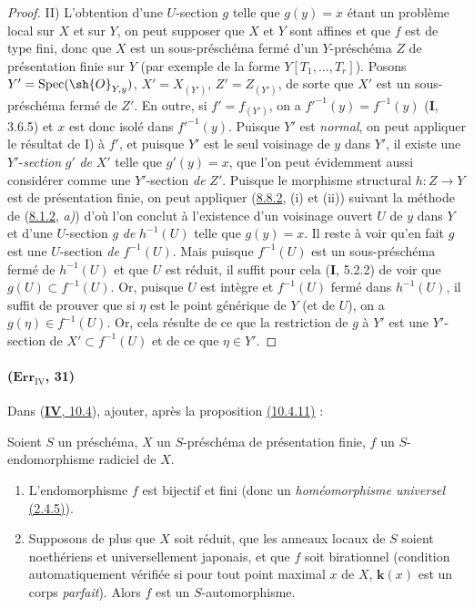 \begin{proof}
\textup{II)} L'obtention d'une $U$-section $g$ telle que $g(y)=x$ étant
un problème local sur $X$ et sur $Y$, on peut supposer que $X$ et $Y$
sont affines et que $f$ est de type fini, donc que $X$ est un
sous-préschéma fermé d'un $Y$-préschéma $Z$ de présentation finie sur
$Y$ (par exemple de la forme $Y[T_1,\ldots,T_r]$). Posons $Y'=\operatorname{Spec}(\sh{O}_{Y,y})$, $X'=X_{(Y')}$, $Z'=Z_{(Y')}$,
de sorte que $X'$ est un sous-préschéma fermé de $Z'$. En outre, si
$f'=f_{(Y')}$, on a $f'^{-1}(y)=f^{-1}(y)$ (\textbf{I}, 3.6.5) et $x$ est donc
isolé dans $f'^{-1}(y)$. Puisque $Y'$ est \emph{normal}, on peut appliquer le
résultat de I) à $f'$, et puisque $Y'$ est le seul voisinage de $y$ dans
$Y'$, il existe une $Y'$-\emph{section} $g'$ \emph{de} $X'$ telle que $g'(y)=x$, que
l'on peut évidemment aussi considérer comme une $Y'$-section \emph{de} $Z'$.
Puisque le morphisme structural $h:Z\to Y$ est de présentation finie,
on peut appliquer ({\hyperref[canon-index.ega4.c04.thm.8-8-2]{8.8.2}}, (i) et
(ii)) suivant la méthode de
({\hyperref[canon-index.ega4.c04.statement.8-1-2]{8.1.2}}, \emph{a)}) d'où l'on conclut
à l'existence d'un voisinage ouvert $U$ de $y$ dans $Y$ et d'une
$U$-section $g$ \emph{de} $h^{-1}(U)$ telle que $g(y)=x$. Il reste à voir
qu'en fait $g$ est une $U$-section \emph{de} $f^{-1}(U)$. Mais puisque
$f^{-1}(U)$ est un sous-préschéma fermé de $h^{-1}(U)$ et que $U$ est
réduit, il suffit pour cela (\textbf{I}, 5.2.2) de voir que
$g(U)\subset f^{-1}(U)$. Or, puisque $U$ est intègre et $f^{-1}(U)$
fermé dans $h^{-1}(U)$, il suffit de prouver que si $\eta$ est le point
générique de $Y$ (et de $U$), on a $g(\eta)\in f^{-1}(U)$. Or, cela
résulte de ce que la restriction de $g$ à $Y'$ est une $Y'$-section de
$X'\subset f^{-1}(U)$ et de ce que $\eta\in Y'$.
\end{proof}

\paragraph{($\mathbf{Err}_{\mathrm{IV}}$, 31)}
Dans ({\hyperref[canon-index.ega4.c04.subsec.10-4]{\textbf{IV}, 10.4}}), ajouter, après la
proposition {\hyperref[canon-index.ega4.c04.statement.10-4-11]{(10.4.11)}} :

\begin{corollary}[10.4.12]
Soient $S$ un préschéma, $X$ un $S$-préschéma de présentation finie,
$f$ un $S$-endomorphisme radiciel de $X$.
\begin{enumerate}[label=\textup{(\roman*)}]
\item L'endomorphisme $f$ est bijectif et \textup{fini (donc un \emph{homéomorphisme
universel} {\hyperref[canon-index.ega4.c04.prop.2-4-5]{(2.4.5)}})}.
\item Supposons de plus que $X$ soit réduit, que les anneaux locaux de
$S$ soient noethériens et universellement japonais, et que $f$ soit
birationnel \textup{(condition automatiquement vérifiée si pour tout point
maximal $x$ de $X$, $\boldsymbol{k}(x)$ est un corps \emph{parfait})}. Alors $f$ est un
$S$-automorphisme.
\end{enumerate}
\end{corollary}

